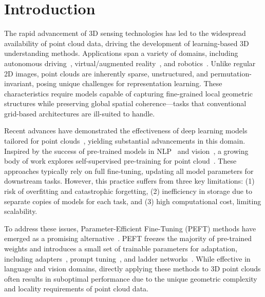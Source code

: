 \section{Introduction}
\label{sec:intro}


The rapid advancement of 3D sensing technologies has led to the widespread availability of point cloud data, driving the development of learning-based 3D understanding methods. Applications span a variety of domains, including autonomous driving~\cite{yang2024visual,song2024graphbev,chen20203d}, virtual/augmented reality~\cite{casado2023rendering,garrido2021point}, and robotics~\cite{wang2021trajectory,chen2022direct,christen2023learning}. Unlike regular 2D images, point clouds are inherently sparse, unstructured, and permutation-invariant, posing unique challenges for representation learning. These characteristics require models capable of capturing fine-grained local geometric structures while preserving global spatial coherence—tasks that conventional grid-based architectures are ill-suited to handle.

Recent advances have demonstrated the effectiveness of deep learning models tailored for point clouds~\cite{qi2017pointnet, qi2017pointnet++, li2018pointcnn, qian2022pointnext, wang2019dynamic, wu2024point}, yielding substantial advancements in this domain. Inspired by the success of pre-trained models in NLP~\cite{devlin2018bert, brown2020language} and vision~\cite{he2020momentum, chen2020improved}, a growing body of work explores self-supervised pre-training for point cloud~\cite{pang2022masked, yu2022point, zhang2022point, afham2022crosspoint}. These approaches typically rely on full fine-tuning, updating all model parameters for downstream tasks. However, this practice suffers from three key limitations: (1) risk of overfitting and catastrophic forgetting, (2) inefficiency in storage due to separate copies of models for each task, and (3) high computational cost, limiting scalability.

To address these issues, Parameter-Efficient Fine-Tuning (PEFT) methods have emerged as a promising alternative~\cite{houlsby2019parameter, jie2023fact, karimi2021compacter}. PEFT freezes the majority of pre-trained weights and introduces a small set of trainable parameters for adaptation, including adapters~\cite{houlsby2019parameter, chen2022adaptformer}, prompt tuning~\cite{li2021prefix, lester-etal-2021-power}, and ladder networks~\cite{sung2022lst}. While effective in language and vision domains, directly applying these methods to 3D point clouds often results in suboptimal performance due to the unique geometric complexity and locality requirements of point cloud data.

